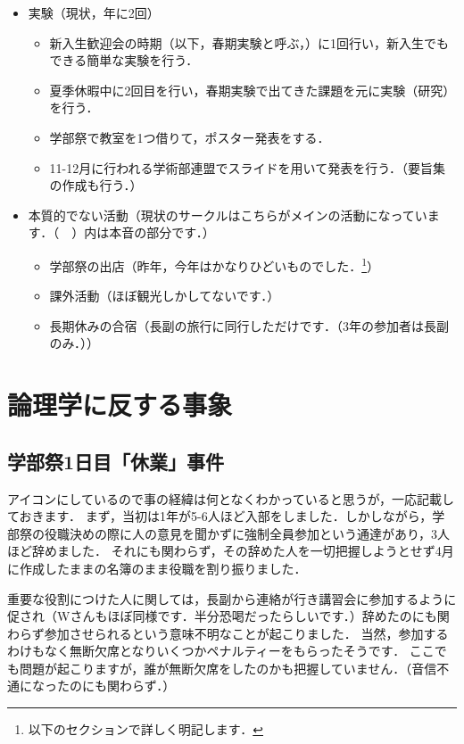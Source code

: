 \documentclass[a4paper,11pt]{ltjsarticle}
\begin{document}
\begin{itemize}
    \item 実験（現状，年に2回）
    \begin{itemize}
        \item 新入生歓迎会の時期（以下，春期実験と呼ぶ，）に1回行い，新入生でもできる簡単な実験を行う．
        \item 夏季休暇中に2回目を行い，春期実験で出てきた課題を元に実験（研究）を行う．
        \item 学部祭で教室を1つ借りて，ポスター発表をする．
        \item 11-12月に行われる学術部連盟でスライドを用いて発表を行う．（要旨集の作成も行う．）
    \end{itemize}
\clearpage
    \item 本質的でない活動（現状のサークルはこちらがメインの活動になっています．（　）内は本音の部分です．）
    \begin{itemize}
        \item 学部祭の出店（昨年，今年はかなりひどいものでした．\footnote{以下のセクションで詳しく明記します．}）
        \item 課外活動（ほぼ観光しかしてないです．）
        \item 長期休みの合宿（長副の旅行に同行しただけです．（3年の参加者は長副のみ．））
    \end{itemize}
\end{itemize}

\section{論理学に反する事象}

\subsection{学部祭1日目「休業」事件}

アイコンにしているので事の経緯は何となくわかっていると思うが，一応記載しておきます．
まず，当初は1年が5-6人ほど入部をしました．しかしながら，学部祭の役職決めの際に人の意見を聞かずに強制全員参加という通達があり，3人ほど辞めました．
それにも関わらず，その辞めた人を一切把握しようとせず4月に作成したままの名簿のまま役職を割り振りました．

重要な役割につけた人に関しては，長副から連絡が行き講習会に参加するように促され（Wさんもほぼ同様です．半分恐喝だったらしいです．）辞めたのにも関わらず参加させられるという意味不明なことが起こりました．
当然，参加するわけもなく無断欠席となりいくつかペナルティーをもらったそうです．
ここでも問題が起こりますが，誰が無断欠席をしたのかも把握していません．（音信不通になったのにも関わらず．）
\end{document}
